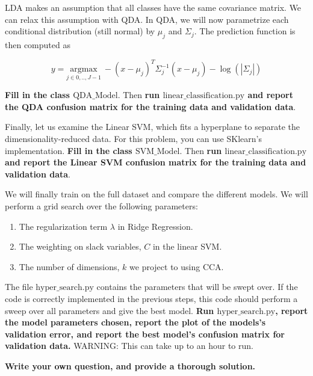 \begin{Parts}
 \Part LDA makes an assumption that all classes have the same covariance matrix. We can relax this assumption with QDA. In QDA, we will now parametrize each conditional distribution (still normal) by $\mu_j$ and $\Sigma_j$. The prediction function is then computed as 

 $$y = \underset{j\in{0,..,J-1}}{\mbox{argmax}} \: -(x-\mu_j)^T\Sigma_j^{-1}(x-\mu_j) - \log(|\Sigma_j|) $$


{\bf Fill in the class $\mbox{QDA\_Model}$}. Then {\bf run $\mbox{linear\_classification.py}$ and report the QDA confusion matrix for the training data and validation data}.

 

 \Part Finally, let us examine the Linear SVM, which fits a hyperplane
 to separate the dimensionality-reduced data. For this problem, you can use SKlearn's implementation. 
 {\bf Fill in the class $\mbox{SVM\_Model}$}. Then {\bf run $\mbox{linear\_classification.py}$ and report the Linear SVM confusion matrix for the training data and validation data}.




 \Part We will finally train on the full dataset and compare the different models.  We will perform a grid search over the following parameters:
 \begin{enumerate}
\item The regularization term $\lambda$ in Ridge Regression. 
\item The weighting on slack variables, $C$ in the linear SVM. 
\item The number of dimensions, $k$ we project to using CCA.
\end{enumerate} 

The file $\mbox{hyper\_search.py}$ contains the parameters that will
be swept over. If the code is correctly implemented in the previous
steps, this code should perform a sweep over all parameters and give
the best model. {\bf Run $\mbox{hyper\_search.py}$, report the model
  parameters chosen, report the plot of the models's validation error, and report the best model's confusion matrix for validation data.} WARNING: This can take up to an hour to run.






\end{Parts}


{\bf Write your own question, and provide a thorough solution.}

